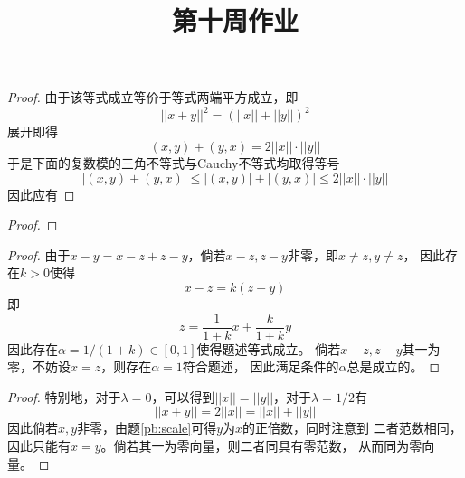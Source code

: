 \documentclass[cn]{homework}
\title{第十周作业}
\begin{document}
    \maketitle

    \problem
    \label{pb:scale}
    \begin{subproblem}[(\arabic*)]
        \item
        \begin{proof}
            由于该等式成立等价于等式两端平方成立，即
            \[||x+y||^2=(||x||+||y||)^2\]
            展开即得
            \[(x,y)+(y,x)=2||x||\cdot||y||\]
            于是下面的复数模的三角不等式与Cauchy不等式均取得等号
            \[|(x,y)+(y,x)|\leq|(x,y)|+|(y,x)|\leq 2||x||\cdot||y||\]
            因此应有

        \end{proof}

        \item
        \begin{proof}
        \end{proof}

        \item
        \begin{proof}
            由于$x-y=x-z+z-y$，倘若$x-z,z-y$非零，即$x\neq z,y\neq z$，
            因此存在$k>0$使得
            \[x-z=k(z-y)\]
            即
            \[z=\frac{1}{1+k}x+\frac{k}{1+k}y\]
            因此存在$\alpha=1/(1+k)\in[0,1]$使得题述等式成立。
            倘若$x-z,z-y$其一为零，不妨设$x=z$，则存在$\alpha=1$符合题述，
            因此满足条件的$\alpha$总是成立的。
        \end{proof}
    \end{subproblem}

    \problem
    \begin{proof}
        特别地，对于$\lambda=0$，可以得到$||x||=||y||$，对于$\lambda=1/2$有
        \[||x+y||=2||x||=||x||+||y||\]
        因此倘若$x,y$非零，由题\ref{pb:scale}可得$y$为$x$的正倍数，同时注意到
        二者范数相同，因此只能有$x=y$。倘若其一为零向量，则二者同具有零范数，
        从而同为零向量。

    \end{proof}
\end{document}
